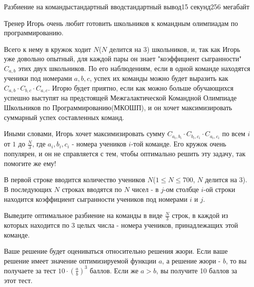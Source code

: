 \begin{problem}{Разбиение на команды}{стандартный ввод}{стандартный вывод}{15 секунд}{256 мегабайт}

Тренер Игорь очень любит готовить школьников к командным олимпиадам по программированию. 

Всего к нему в кружок ходит $N$($N$ делится на $3$) школьников, и, так как Игорь уже довольно опытный, для каждой пары он знает "коэффициент сыгранности" $C_{a,b}$ этих двух школьников. По его наблюдениям, если в одной команде находятся ученики под номерами $a,b,c$, успех их команды можно будет выразить как $C_{a,b} \cdot C_{b,c} \cdot C_{a,c}$. Игорю будет приятно, если как можно больше обучающихся успешно выступят на предстоящей Межгалактической Командной Олимпиаде Школьников по Программированию(МКОШП), и он хочет максимизировать суммарный успех составленных команд.

Иными словами, Игорь хочет максимизировать сумму $C_{a_i, b_i} \cdot C_{b_i,c_i} \cdot C_{a_i, c_i}$ по всем $i$ от $1$ до $\frac{N}{3}$, где $a_i,b_i,c_i$ - номера учеников $i$-той команде.
Его кружок очень популярен, и он не справляется с тем, чтобы оптимально решить эту задачу, так помогите же ему!

\InputFile
В первой строке вводится количество учеников $N$($1\leq N \leq 700$, $N$ делится на $3$).
В последующих $N$ строках вводятся по $N$ чисел - в $j$-ом столбце $i$-ой строки находится коэффициент сыгранности учеников под номерами $i$ и $j$.


\OutputFile
Выведите оптимальное разбиение на команды в виде $\frac{N}{3}$ строк, в каждой из которых находится по 3 целых числа - номера учеников, принадлежащих этой команде.

\Scoring
Ваше решение будет оцениваться относительно решения жюри. Если ваше решение имеет значение оптимизируемой функции $a$, а решение жюри - $b$, то вы получаете за тест $10 \cdot (\frac{a}{b})^3$ баллов. Если же $a > b$, вы получите 10 баллов за этот тест.


\end{problem}

